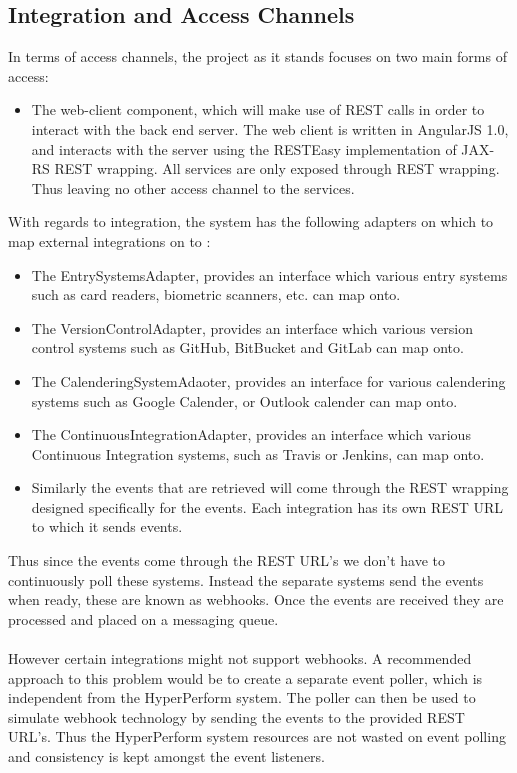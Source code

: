 \documentclass[11pt,a4paper]{article}
\begin{document}
\subsection{Integration and Access Channels}
In terms of access channels, the project as it stands focuses on two main forms of access:
\begin{itemize}
	\item The web-client component, which will make use of REST calls in order to interact with the back end server. The web client is written in AngularJS 1.0, and interacts with the server using the RESTEasy implementation of JAX-RS REST wrapping. All services are only exposed through REST wrapping. Thus leaving no other access channel to the services.
\end{itemize}
With regards to integration, the system has the following adapters on which to map external integrations on to :
\begin{itemize}
	\item The EntrySystemsAdapter, provides an interface which various entry systems such as card readers, biometric scanners, etc. can map onto.
	\item The VersionControlAdapter, provides an interface which various version control systems such as GitHub, BitBucket and GitLab can map onto.
	\item The CalenderingSystemAdaoter, provides an interface for various calendering systems such as Google Calender, or Outlook calender can map onto.
	\item The ContinuousIntegrationAdapter, provides an interface which various Continuous Integration systems, such as Travis or Jenkins, can map onto.
	
	\item Similarly the events that are retrieved will come through the REST wrapping designed specifically for the events. Each integration has its own REST URL to which it sends events.
\end{itemize}
Thus since the events come through the REST URL's we don't have to continuously poll these systems. Instead the separate systems send the events when ready, these are known as webhooks. Once the events are received they are processed and placed on a messaging queue.\\ \\
However certain integrations might not support webhooks. A recommended approach to this problem would be to create a separate event poller, which is independent from the HyperPerform system. The poller can then be used to simulate webhook technology by sending the events to the provided REST URL's. Thus the HyperPerform system resources are not wasted on event polling and consistency is kept amongst the event listeners.
\end{document}
